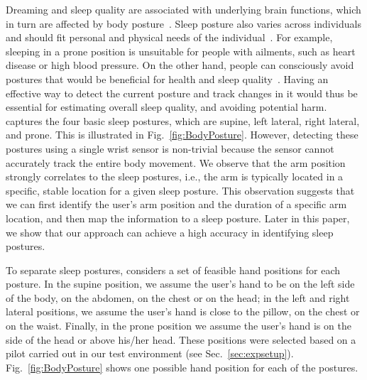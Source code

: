 Dreaming and sleep quality are associated with underlying brain functions, which in turn are affected by body posture~\cite{posture2004}.
Sleep posture also varies across individuals and should fit personal and physical needs of the individual~\cite{posture2016,posture2017}.
For example, sleeping in a prone position is unsuitable for people with ailments, such as heart disease or high blood pressure. On the
other hand, people can consciously avoid postures that would be beneficial for health and sleep quality~\cite{posture2015}. Having an
effective way to detect the current posture and track changes in it would thus be essential for estimating overall sleep quality, and
avoiding potential harm. \systemname captures the four basic sleep postures, which are supine, left lateral, right lateral, and prone. This
is illustrated in Fig.~\ref{fig:BodyPosture}. However, detecting these postures using a single wrist sensor is non-trivial because the
sensor cannot accurately track the entire body movement. We observe that the arm position strongly correlates to the sleep postures, i.e.,
the arm is typically located in a specific, stable location for a given sleep posture. This observation suggests that we can first identify
the user's arm position and the duration of a specific arm location, and then map the information to a sleep posture. Later in this paper,
we show that our approach can achieve a high accuracy in identifying sleep postures.





To separate sleep postures, {\systemname} considers a set of feasible hand positions for each posture. In the supine position, we assume the user's hand to be on the left side of the body, on the abdomen, on the chest or on the head; in the left and right lateral positions, we assume the user's hand is close to the pillow, on the chest or on the waist. Finally, in the prone position we assume the user's hand is on the side of the head or above his/her head. These positions were selected based on a pilot carried out in our test environment (see Sec.~\ref{sec:expsetup}). Fig.~\ref{fig:BodyPosture} shows one possible hand position for each of the postures.

